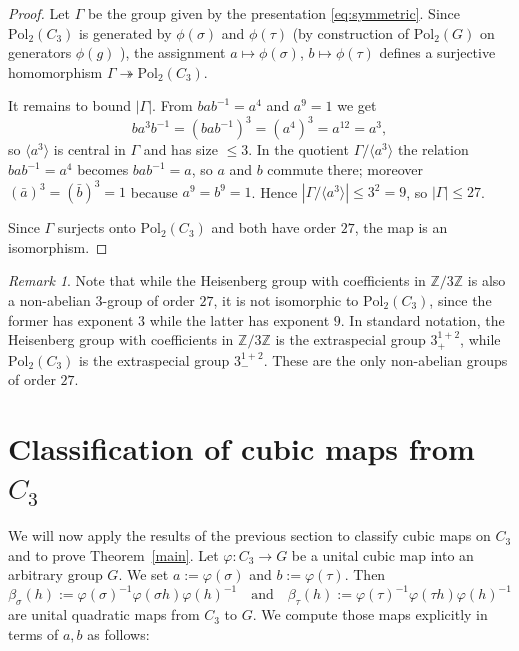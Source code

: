 \documentclass[11pt, a4paper]{amsproc}
\theoremstyle{remark}
\newtheorem{remark}{Remark}
\theoremstyle{plain}
\begin{document}
\begin{proof}
Let $\Gamma$ be the group given by the presentation \eqref{eq:symmetric}.
Since $\mathrm{Pol}_2(C_3)$ is generated by $\phi(\sigma)$ and $\phi(\tau)$
(by construction of $\mathrm{Pol}_2(G)$ on generators $\phi(g)$ \cite[\S2, proof of Theorem~1.2]{AJ}),
the assignment $a\mapsto \phi(\sigma)$, $b\mapsto \phi(\tau)$ defines a surjective homomorphism
$\Gamma\twoheadrightarrow \mathrm{Pol}_2(C_3)$.

It remains to bound $|\Gamma|$.
From $bab^{-1}=a^4$ and $a^9=1$ we get
\[
ba^3b^{-1}=(bab^{-1})^3=(a^4)^3=a^{12}=a^3,
\]
so $\langle a^3\rangle$ is central in $\Gamma$ and has size $\le 3$.
In the quotient $\Gamma/\langle a^3\rangle$ the relation $bab^{-1}=a^4$ becomes $bab^{-1}=a$,
so $a$ and $b$ commute there; moreover $(\bar a)^3=(\bar b)^3=1$ because $a^9=b^9=1$.
Hence $|\Gamma/\langle a^3\rangle|\le 3^2=9$, so $|\Gamma|\le 27$.

Since $\Gamma$ surjects onto $\mathrm{Pol}_2(C_3)$ and both have order $27$, the map is an isomorphism.
\end{proof}

\begin{remark} \label{rem:Heisenberg}
Note that while the Heisenberg group with coefficients in $\mathbb{Z}/3\mathbb{Z}$ is also a non-abelian $3$-group of order $27$, it is not isomorphic to $\mathrm{Pol}_2(C_3)$, since the former has exponent $3$ while the latter has exponent $9$. In standard notation, the Heisenberg group with coefficients in $\mathbb{Z}/3\mathbb{Z}$ is the extraspecial group $3^{1+2}_+$, while $\mathrm{Pol}_2(C_3)$ is the extraspecial group $3^{1+2}_-$. These are the only non-abelian groups of order $27$.
\end{remark}

\section{Classification of cubic maps from $C_3$}
\label{sec:cubic}

We will now apply the results of the previous section to classify cubic maps on $C_3$ and to prove Theorem~\ref{main}.
Let $\varphi \colon C_3 \to G$ be a unital cubic map into an arbitrary group $G$. We set $a:= \varphi(\sigma)$ and $b:=\varphi(\tau)$. Then
\[
\beta_\sigma(h):= \varphi(\sigma)^{-1}\varphi(\sigma h)\varphi(h)^{-1}
\quad \mbox{and} \quad
\beta_\tau(h):= \varphi(\tau)^{-1}\varphi(\tau h)\varphi(h)^{-1}
\]
are unital quadratic maps from $C_3$ to $G$. We compute those maps explicitly in terms of $a,b$ as follows:
\end{document}

